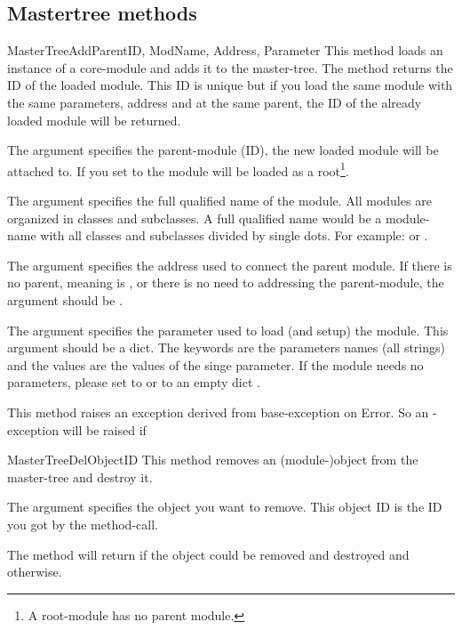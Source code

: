 \subsection{Mastertree methods}
\begin{methoddesc}[Core]{MasterTreeAdd}{ParentID, ModName, Address, Parameter}
This method loads an instance of a core-module and adds it to the master-tree. 
The method returns the ID of the loaded module. This ID is unique but if you 
load the same module with the same parameters, address and at the same parent, 
the ID of the already loaded module will be returned.

The argument  specifies the parent-module (ID), the new loaded 
module will be attached to. If you set  to  the 
module will be loaded as a root\footnote{A root-module has no parent module.}. 

The argument  specifies the full qualified name of the module. 
All modules are organized in classes and subclasses. A full qualified name 
would be a module-name with all classes and subclasses divided by single dots. 
For example:  or .

The argument  specifies the address used to connect the parent 
module. If there is no parent, meaning  is , or there
is no need to addressing the parent-module, the argument  should 
be .

The argument  specifies the parameter used to load (and setup) 
the module. This argument should be a dict.  The keywords are the parameters 
names (all strings) and the values are the values of the singe parameter.  
 If the module needs no parameters, 
please set  to  or to an empty dict \code{\{\}}.

This method raises an exception derived from base-exception  
on Error. So an -exception will be raised if 
\end{methoddesc}


\begin{methoddesc}[Core]{MasterTreeDel}{ObjectID}
This method removes an (module-)object from the master-tree and destroy it. 

The argument  specifies the object you want to remove. This 
object ID is the ID you got by the  method-call.

The method will return  if the object could be removed and destroyed 
and  otherwise.
\end{methoddesc}


